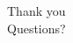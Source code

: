 \documentclass[aspectratio=169,11pt]{beamer}
\begin{document}
\begin{frame}[standout]
  Thank you\\[6pt]
  \normalsize Questions?
\end{frame}
\end{document}
